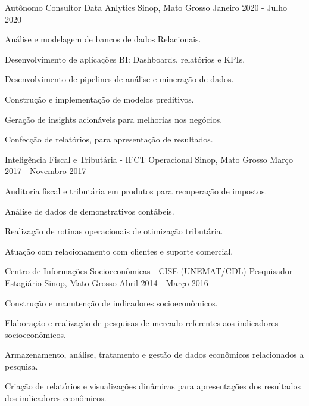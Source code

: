 \documentclass[11pt, letter]{awesome-cv}
\begin{document}
\vspace{-3mm}
\vspace{-3mm}
\begin{cventries}
	\cventry
	{Autônomo}
	{Consultor Data Anlytics\vspace{-2mm}}
	{Sinop, Mato Grosso\vspace{-2mm}}
	{Janeiro 2020 - Julho 2020}
	{
		\begin{cvitems}
			\item {Análise e modelagem de bancos de dados Relacionais.}
			\item {Desenvolvimento de aplicações BI: Dashboards, relatórios e KPIs.}
			\item {Desenvolvimento de pipelines de análise e mineração de dados. }
			\item {Construção e implementação de modelos preditivos.}
			\item { Geração de insights acionáveis ​​para melhorias nos negócios. }
			\item{ Confecção de relatórios, para apresentação de resultados.\vspace{-2mm}}
		\end{cvitems}
	}
	\cventry
	{Inteligência Fiscal e Tributária - IFCT}
	{Operacional\vspace{-2mm}}
	{Sinop, Mato Grosso\vspace{-2mm}}
	{Março 2017 - Novembro 2017}
	{
		\begin{cvitems}
			\item {Auditoria fiscal e tributária em produtos para recuperação de impostos.}
			\item {Análise de dados de demonstrativos contábeis.}
			\item {Realização de rotinas operacionais de otimização tributária.}
			\item{Atuação com relacionamento com clientes e suporte comercial.\vspace{-2mm}}
		\end{cvitems}
	}
	\cventry
	{Centro de Informações Socioeconômicas - CISE (UNEMAT/CDL)}
	{Pesquisador Estagiário\vspace{-2mm}}
	{Sinop, Mato Grosso\vspace{-2mm}}
	{Abril 2014 - Março 2016}
	{
		\begin{cvitems}
			\item {Construção e manutenção de indicadores socioeconômicos.}
			\item {Elaboração e realização de pesquisas de mercado referentes aos indicadores socioeconômicos.}
			\item {Armazenamento, análise, tratamento e gestão de dados econômicos relacionados a pesquisa.}
			\item {Criação de relatórios e visualizações dinâmicas para apresentações dos resultados dos indicadores econômicos.\vspace{-2mm}}
		\end{cvitems}
	}
\end{cventries}
\end{document}
